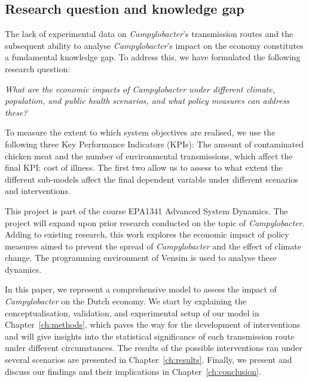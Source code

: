 \subsection*{Research question and knowledge gap}

The lack of experimental data on \textit{Campylobacter}’s transmission routes and the subsequent ability to analyse \textit{Campylobacter}’s impact on the economy constitutes a fundamental knowledge gap. To address this, we have formulated the following research question:
\begin{center}\textit{\textcolor{NiceBlue}{
What are the economic impacts of Campylobacter under different climate, population, and public health scenarios, and what policy measures can address these? 
}}
\end{center}
To measure the extent to which system objectives are realised, we use the following three Key Performance Indicators (KPIs): The amount of contaminated chicken meat and the number of environmental transmissions, which affect the final KPI: cost of illness. The first two allow us to assess to what extent the different sub-models affect the final dependent variable under different scenarios and interventions.

This project is part of the course EPA1341 Advanced System Dynamics. The project will expand upon prior research conducted on the topic of \textit{Campylobacter}. Adding to existing research, this work explores the economic impact of policy measures aimed to prevent the spread of  \textit{Campylobacter} and the effect of climate change. The programming environment of Vensim is used to analyse these dynamics. 

In this paper, we represent a comprehensive model to assess the impact of \textit{Campylobacter} on the Dutch economy. We start by explaining the conceptualisation, validation, and experimental setup of our model in Chapter~\ref{ch:methods}, which paves the way for the development of interventions and will give insights into the statistical significance of each transmission route under different circumstances. The results of the possible interventions ran under several scenarios are presented in Chapter~\ref{ch:results}. Finally, we present and discuss our findings and their implications in Chapter~\ref{ch:conclusion}.

